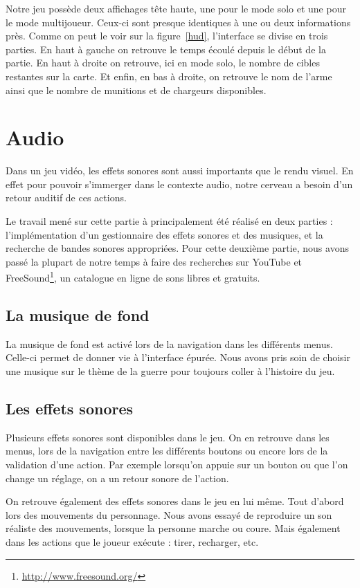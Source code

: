 \documentclass[11pt]{report}
\begin{document}
Notre jeu possède deux affichages tête haute, une pour le mode solo et une pour le mode multijoueur. Ceux-ci sont presque identiques à une ou deux informations près. Comme on peut le voir sur la figure~\ref{hud}, l'interface se divise en trois parties. En haut à gauche on retrouve le temps écoulé depuis le début de la partie. En haut à droite on retrouve, ici en mode solo, le nombre de cibles restantes sur la carte. Et enfin, en bas à droite, on retrouve le nom de l'arme ainsi que le nombre de munitions et de chargeurs disponibles.

\chapter{Audio}

Dans un jeu vidéo, les effets sonores sont aussi importants que le rendu visuel. En effet pour pouvoir s'immerger dans le contexte audio, notre cerveau a besoin d'un retour auditif de ces actions.

Le travail mené sur cette partie à principalement été réalisé en deux parties : l'implémentation d'un gestionnaire des effets sonores et des musiques, et la recherche de bandes sonores appropriées. Pour cette deuxième partie, nous avons passé la plupart de notre temps à faire des recherches sur YouTube et FreeSound\footnote{\url{http://www.freesound.org/}}, un catalogue en ligne de sons libres et gratuits.

\section{La musique de fond}

La musique de fond est activé lors de la navigation dans les différents menus. Celle-ci permet de donner vie à l'interface épurée. Nous avons pris soin de choisir une musique sur le thème de la guerre pour toujours coller à l'histoire du jeu.

\section{Les effets sonores}

Plusieurs effets sonores sont disponibles dans le jeu. On en retrouve dans les menus, lors de la navigation entre les différents boutons ou encore lors de la validation d'une action. Par exemple lorsqu'on appuie sur un bouton ou que l'on change un réglage, on a un retour sonore de l'action.

On retrouve également des effets sonores dans le jeu en lui même. Tout d'abord lors des mouvements du personnage. Nous avons essayé de reproduire un son réaliste des mouvements, lorsque la personne marche ou coure. Mais également dans les actions que le joueur exécute : tirer, recharger, etc.
\end{document}
